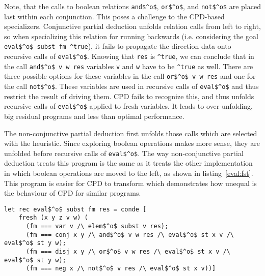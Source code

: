 Note, that the calls to boolean relations \lstinline{and$^o$}, \lstinline{or$^o$}, and \lstinline{not$^o$} are placed last within each conjunction.
This poses a challenge to the CPD-based specializers.
Conjunctive partial deduction unfolds relation calls from left to right, so when specializing this relation for running backwards (i.e. considering the goal \lstinline{eval$^o$ subst fm ^true}), it fails to propagate the direction data onto recursive calls of \lstinline{eval$^o$}.
Knowing that \lstinline{res} is \lstinline{^true}, we can conclude that in the call \lstinline{and$^o$ v w res} variables \lstinline{v} and \lstinline{w} have to be \lstinline{^true} as well.
There are three possible options for these variables in the call \lstinline{or$^o$ v w res} and one for the call \lstinline{not$^o$}.
These variables are used in recursive calls of \lstinline{eval$^o$} and thus restrict the result of driving them.
CPD fails to recognize this, and thus unfolds recursive calls of \lstinline{eval$^o$} applied to fresh variables.
It leads to over-unfolding, big residual programs and less than optimal performance.

The non-conjunctive partial deduction first unfolds those calls which are selected with the heuristic.
Since exploring boolean operations makes more sense, they are unfolded before recursive calls of \lstinline{eval$^o$}.
The way non-conjunctive partial deduction treats this program is the same as it treats the other implementation in which boolean operations are moved to the left, as shown in listing~\ref{eval:fst}.
This program is easier for CPD to transform which demonstrates how unequal is the behaviour of CPD for similar programs.

\begin{figure*}[!h]
  \centering
  \begin{minipage}{0.85\textwidth}
    \begin{lstlisting}[label={eval:fst}, caption={Evaluator of formulas with boolean operation second}, captionpos=b, frame=tb]
  let rec eval$^o$ subst fm res = conde [
    fresh (x y z v w) (
      (fm === var v /\ elem$^o$ subst v res);
      (fm === conj x y /\ and$^o$ v w res /\ eval$^o$ st x v /\ eval$^o$ st y w);
      (fm === disj x y /\ or$^o$ v w res /\ eval$^o$ st x v /\ eval$^o$ st y w);
      (fm === neg x /\ not$^o$ v res /\ eval$^o$ st x v))]
    \end{lstlisting}
  \end{minipage}
\end{figure*}

